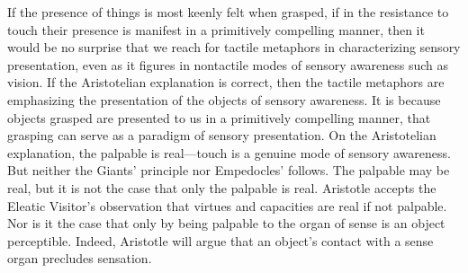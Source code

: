 If the presence of things is most keenly felt when grasped, if in the resistance to touch their presence is manifest in a primitively compelling manner, then it would be no surprise that we reach for tactile metaphors in characterizing sensory presentation, even as it figures in nontactile modes of sensory awareness such as vision. If the Aristotelian explanation is correct, then the tactile metaphors are emphasizing the presentation of the objects of sensory awareness. It is because objects grasped are presented to us in a primitively compelling manner, that grasping can serve as a paradigm of sensory presentation. On the Aristotelian explanation, the palpable is real---touch is a genuine mode of sensory awareness. But neither the Giants' principle nor Empedocles' follows. The palpable may be real, but it is not the case that only the palpable is real. Aristotle accepts the Eleatic Visitor's observation that virtues and capacities are real if not palpable. Nor is it the case that only by being palpable to the organ of sense is an object perceptible. Indeed, Aristotle will argue that an object's contact with a sense organ precludes sensation.

